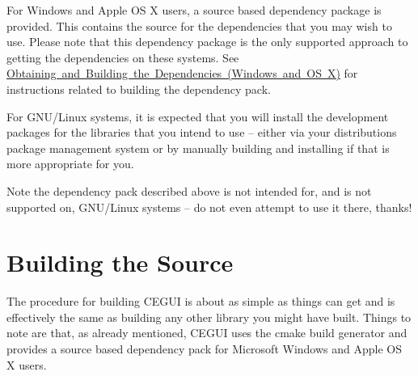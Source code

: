 For Windows and Apple OS X users, a source based dependency package is provided. This contains the source for the dependencies that you may wish to use. Please note that this dependency package is the only supported approach to getting the dependencies on these systems. See \mbox{\hyperlink{building_deps}{Obtaining and Building the Dependencies (Windows and OS X)}} for instructions related to building the dependency pack.

For G\+N\+U/\+Linux systems, it is expected that you will install the development packages for the libraries that you intend to use – either via your distribution\textquotesingle{}s package management system or by manually building and installing if that is more appropriate for you. \begin{DoxyNote}{Note}
the dependency pack described above is not intended for, and is not supported on, G\+N\+U/\+Linux systems – do not even attempt to use it there, thanks!
\end{DoxyNote}
\hypertarget{compiling_compiling_build}{}\section{Building the Source}\label{compiling_compiling_build}
The procedure for building C\+E\+G\+UI is about as simple as things can get and is effectively the same as building any other library you might have built. Things to note are that, as already mentioned, C\+E\+G\+UI uses the cmake build generator and provides a source based dependency pack for Microsoft Windows and Apple OS X users.

